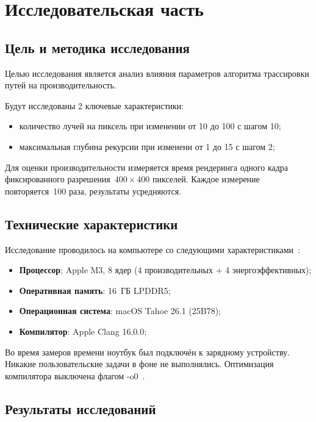 \section{Исследовательская часть}
\subsection{Цель и методика исследования}

Целью исследования является анализ влияния параметров алгоритма трассировки путей
на производительность.

Будут исследованы 2 ключевые характеристики:
\begin{itemize}
    \item количество лучей на пиксель при изменении от 10 до 100 с шагом 10;
    \item максимальная глубина рекурсии при изменени от 1 до 15 с шагом 2;
\end{itemize}

Для оценки производительности измеряется время рендеринга одного кадра фиксированного разрешения~$400 \times 400$ пикселей.
Каждое измерение повторяется~100 раза, результаты усредняются.

\subsection{Технические характеристики}

Исследование проводилось на компьютере со следующими характеристиками~\cite{macbook-m3}:

\begin{itemize}
    \item \textbf{Процессор}: Apple M3, 8 ядер (4 производительных + 4 энергоэффективных);
    \item \textbf{Оперативная память}: 16~ГБ LPDDR5;
    \item \textbf{Операционная система}: macOS Tahoe 26.1 (25B78);
    \item \textbf{Компилятор}: Apple Clang 16.0.0;
\end{itemize}

Во время замеров времени ноутбук был подключён к зарядному устройству.
Никакие пользовательские задачи в фоне не выполнялись. Оптимизация компилятора выключена флагом -o0~\cite{compilator-level-optimize}.

\subsection{Результаты исследований}

